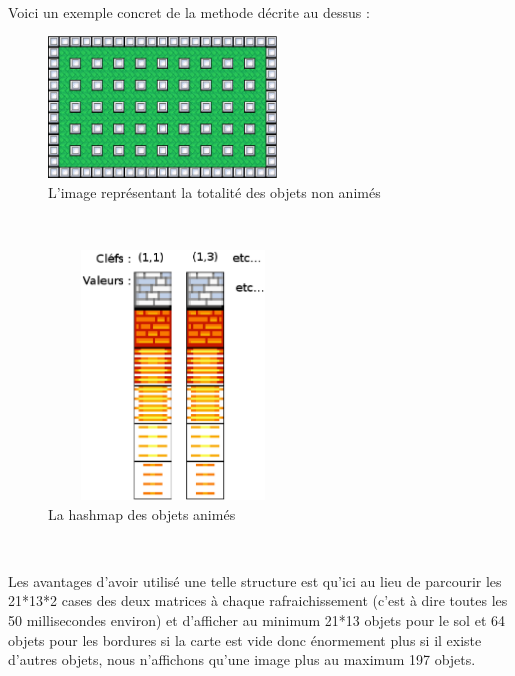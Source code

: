			$\,$
			
			Voici un exemple concret de la methode décrite au dessus :
				

			\begin{figure}[!h]			
				\begin{center}			
					\includegraphics[width=229px, height=142px]{Developpement/Img/map.eps}
					\caption{L'image représentant la totalité des objets non animés}
				\end{center}
			\end{figure}
			
			$\,$			

			\begin{figure}[!h]			
				\begin{center}						
					\includegraphics[width=250px, height=250px]{Developpement/Img/hashmap.eps}
					\caption{La hashmap des objets animés}
				\end{center}
			\end{figure}

			$\,$
			
			\newpage

			Les avantages d'avoir utilisé une telle structure est qu'ici au lieu de
			parcourir les 21*13*2 cases des deux matrices à chaque rafraichissement
			(c'est à dire toutes les 50 millisecondes environ) et d'afficher au minimum
			21*13 objets pour le sol et 64 objets pour les bordures si la carte est vide
			donc énormement plus si il existe d'autres objets, nous n'affichons qu'une
			image plus au maximum 197 objets.
			
